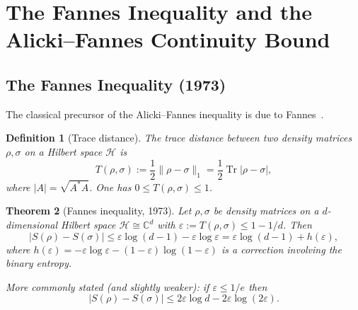 \documentclass[12pt,a4paper]{article}
\newtheorem{theorem}{Theorem}[section]
\newtheorem{definition}[theorem]{Definition}
\DeclareMathOperator{\Tr}{Tr}
\newcommand{\HS}{\mathcal{H}}
\begin{document}
\section{The Fannes Inequality and the Alicki--Fannes Continuity Bound}

\subsection{The Fannes Inequality (1973)}

The classical precursor of the Alicki--Fannes inequality is due to Fannes~\cite{fannes1973}.

\begin{definition}[Trace distance]
The \emph{trace distance} between two density matrices $\rho,\sigma$ on a
Hilbert space $\HS$ is
\[
  T(\rho,\sigma) := \frac{1}{2}\|\rho-\sigma\|_1
                 = \frac{1}{2}\Tr|\rho-\sigma|,
\]
where $|A|=\sqrt{A^*A}$.  One has $0\leq T(\rho,\sigma)\leq 1$.
\end{definition}

\begin{theorem}[Fannes inequality, 1973]\label{thm:fannes}
Let $\rho,\sigma$ be density matrices on a $d$-dimensional Hilbert space
$\HS\cong\mathbb{C}^d$ with $\varepsilon:=T(\rho,\sigma)\leq 1-1/d$.  Then
\begin{equation}\label{eq:fannes}
  |S(\rho)-S(\sigma)| \leq \varepsilon\log(d-1) - \varepsilon\log\varepsilon
                          = \varepsilon\log(d-1) + h(\varepsilon),
\end{equation}
where $h(\varepsilon)=-\varepsilon\log\varepsilon-(1-\varepsilon)\log(1-\varepsilon)$
is a correction involving the binary entropy.

More commonly stated (and slightly weaker): if $\varepsilon\leq 1/e$ then
\begin{equation}\label{eq:fannes_simple}
  |S(\rho)-S(\sigma)| \leq 2\varepsilon\log d - 2\varepsilon\log(2\varepsilon).
\end{equation}
\end{theorem}
\end{document}
